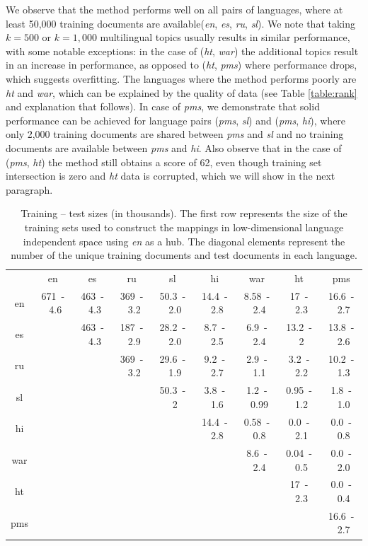 \documentclass[twoside,11pt]{article}
\begin{document}
We observe that the method performs well on all pairs of languages, where at least 50,000 training documents are available(\emph{en}, \emph{es}, \emph{ru}, \emph{sl}). We note that taking $k = 500$ or $k = 1,000$ multilingual topics usually results in similar performance, with some notable exceptions: in the case of (\emph{ht}, \emph{war}) the additional topics result in an increase in performance, as opposed to (\emph{ht}, \emph{pms}) where performance drops, which suggests overfitting. The languages where the method performs poorly are \emph{ht} and \emph{war}, which can be explained by the quality of data (see Table \ref{table:rank} and explanation that follows). In case of \emph{pms}, we demonstrate that solid performance can be achieved for language pairs (\emph{pms}, \emph{sl}) and (\emph{pms}, \emph{hi}), where only 2,000 training documents are shared between \emph{pms} and \emph{sl} and no training documents are available between \emph{pms} and \emph{hi}. Also observe that in the case of (\emph{pms}, \emph{ht}) the method still obtains a score of 62, even though training set intersection is zero and \emph{ht} data is corrupted, which we will show in the next paragraph.
{
\renewcommand\tabcolsep{3pt}
\begin{table}[h!]
\centering
\caption{Training -- test sizes (in thousands).
The first row represents the size of the training sets used to construct the mappings in low-dimensional language independent space using \emph{en} as a hub. The diagonal elements represent the number of the unique training documents and test documents in each language.
}
\label{table:train_test}
{
\small
\begin{tabular}{c|c|c|c|c|c|c|c|c|}
&	en&	es&	ru&	sl&	hi&	war&	ht&	pms\\\cline{1-9}
en&	671~-~4.6&	463~-~4.3&	369~-~3.2&	50.3~-~2.0&	14.4~-~2.8&	8.58~-~2.4&	 17~-~2.3&	16.6~-~2.7\\
\cline{2-9}
es&	\multicolumn{1}{c|}{}	&	463~-~4.3&	187~-~2.9&	28.2~-~2.0&	8.7~-~2.5&	 6.9~-~2.4&	13.2~-~2&	 13.8~-~2.6\\
\cline{3-9}
ru&	\multicolumn{2}{c|}{}	&	369~-~3.2&	29.6~-~1.9 &	9.2~-~2.7&	2.9~-~1.1&	 3.2~-~2.2&	10.2~-~1.3\\
\cline{4-9}
sl&	\multicolumn{3}{c|}{}	&	50.3~-~2&	3.8~-~1.6&	1.2~-~0.99&	0.95~-~1.2&	 1.8~-~1.0\\
\cline{5-9}
hi&	\multicolumn{4}{c|}{}	&	14.4~-~2.8&	0.58~-~0.8&	0.0~-~2.1&	0.0~-~0.8\\
\cline{6-9}
war&	\multicolumn{5}{c|}{}	&	8.6~-~2.4&	0.04~-~0.5&	0.0~-~2.0\\
\cline{7-9}
ht&	\multicolumn{6}{c|}{}	&	17~-~2.3&	0.0~-~0.4\\
\cline{8-9}
pms&	\multicolumn{7}{c|}{}	&	16.6~-~2.7\\
\cline{9-9}
\end{tabular}
}
\end{table}
}
\end{document}
